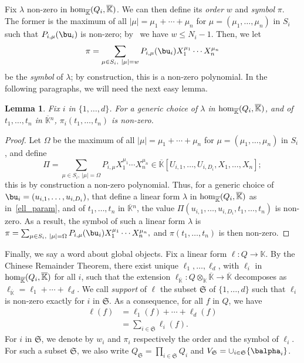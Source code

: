 \documentclass[12pt]{article}
\newtheorem{Lemma}{Lemma}
\def\K {\ensuremath{\mathbb{K}}}
\def\Kbar {{\ensuremath{\overline{\mathbb{K}}}}}
\def\K{\mathbb{K}}
\begin{document}
Fix $\lambda$ non-zero in ${\rm hom}_\Kbar(Q_i,\Kbar)$. We can then
define its {\em order} $w$ and {\em symbol} $\pi$. The former is
the maximum of all $|\mu|=\mu_1+\cdots+\mu_n$ for
$\mu=(\mu_1,\dots,\mu_n)$ in $S_i$ such that $P_{i,\mu}(\bu_i)$ is
non-zero; by~\cite[Lemma~3.3]{Mourrain97} we have $w \le
N_i-1$. Then, we let
$$\pi =\sum_{\mu \in S_i,\ |\mu|=w}P_{i,\mu}(\bu_i) X_1^{\mu_1} \cdots
X_n^{\mu_n}$$ be the {\em symbol} of $\lambda$; by construction,
this is a non-zero polynomial. In the following paragraphs, we will
need the next easy lemma.

\begin{Lemma}\label{lemma:symbol0}
	Fix $i$ in $\{1,\dots,d\}$. For a generic choice of $\lambda$ in ${\rm
		hom}_\Kbar(Q_i,\Kbar)$, and of $t_1,\dots,t_n$ in $\Kbar{}^n$,
	$\pi_i(t_1,\dots,t_n)$ is non-zero.
\end{Lemma}
\begin{proof}
	Let $\Omega$ be the maximum of all $|\mu|=\mu_1+\cdots+\mu_n$ for
	$\mu=(\mu_1,\dots,\mu_n)$ in $S_i$, and define 
	$$\Pi =\sum_{\mu \in S_i,\ |\mu|=\Omega}P_{i,\mu} X_1^{\mu_1} \cdots
	X_n^{\mu_n} \in \Kbar[U_{i,1},\dots,U_{i,D_i},X_1,\dots,X_n];$$ this
	is by construction a non-zero polynomial.  Thus, for a generic
	choice of $\bu_i=(u_{i,1},\dots,u_{i,D_i})$, that define a linear form
	$\lambda$ in ${\rm hom}_\Kbar(Q_i,\Kbar)$ as in~\eqref{ell_param},
	and of $t_1,\dots,t_n$ in $\Kbar{}^n$, the value
	$\Pi(u_{i,1},\dots,u_{i,D_i},t_1,\dots,t_n)$ is non-zero. As a
	result, the symbol of such a linear form $\lambda$ is $\pi =\sum_{\mu \in
		S_i,\ |\mu|=\Omega}P_{i,\mu}(\bu_i) X_1^{\mu_1} \cdots X_n^{\mu_n},$
	and $\pi(t_1,\dots,t_n)$ is then non-zero.
\end{proof}



Finally, we say a word about global objects.  Fix a linear form $\ell:
Q \to \K$. By the Chinese Remainder Theorem, there exist unique
$\ell_1,\dots,\ell_d$, with $\ell_i$ in ${\rm hom}_\Kbar(Q_i,\Kbar)$
for all $i$, such that the extension $\ell_\Kbar: Q\otimes_\K \Kbar
\to \Kbar$ decomposes as $\ell_\Kbar = \ell_1 + \cdots + \ell_d$. We
call {\em support} of $\ell$ the subset $\mathfrak{S}$ of
$\{1,\dots,d\}$ such that $\ell_i$ is non-zero exactly for $i$ in
$\mathfrak{S}$.  As a consequence, for all $f$ in $Q$, we have
\begin{align}\label{eq:fui}
\ell(f) &= \ell_1(f) + \cdots + \ell_d(f)\nonumber\\
&=  \sum_{i \in \mathfrak{S}} \ell_i(f).
\end{align}
For $i$ in $\mathfrak{S}$, we denote by $w_i$ and $\pi_i$ respectively
the order and the symbol of $\ell_i$. For such a subset
$\mathfrak{S}$, we also write $Q_\mathfrak{S}=\prod_{i \in
	\mathfrak{S}} Q_i$ and $V_\mathfrak{S}=\cup_{i \in \mathfrak{S}}
\{\balpha_i\}$.
\end{document}

